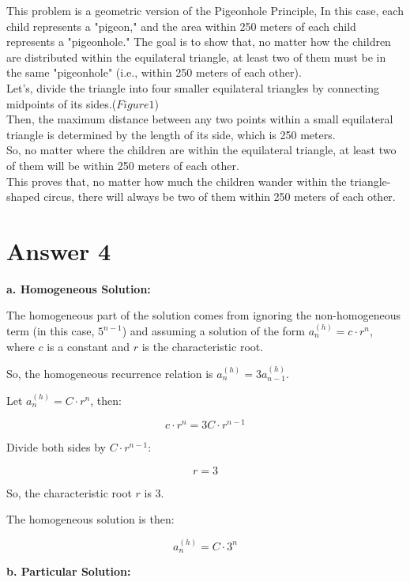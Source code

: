 \documentclass[12pt]{article}
\begin{document}
    This problem is a geometric version of the Pigeonhole Principle, In this case, each child represents a "pigeon," and the area within 250 meters of each child represents a "pigeonhole." The goal is to show that, no matter how the children are distributed within the equilateral triangle, at least two of them must be in the same "pigeonhole" (i.e., within 250 meters of each other). \\

    Let's, divide the triangle into four smaller equilateral triangles by connecting midpoints of its sides.(\( Figure 1 \))\\

    Then, the maximum distance between any two points within a small equilateral triangle is determined by the length of its side, which is 250 meters.\\

    So, no matter where the children are within the equilateral triangle, at least two of them will be within 250 meters of each other.\\

    This proves that, no matter how much the children wander within the triangle-shaped circus, there will always be two of them within 250 meters of each other.\\

\section*{Answer 4}
\textbf{a. Homogeneous Solution:}

The homogeneous part of the solution comes from ignoring the non-homogeneous term (in this case, \(5^{n-1}\)) and assuming a solution of the form \(a_n^{(h)} = c \cdot r^n\), where \(c\) is a constant and \(r\) is the characteristic root.

So, the homogeneous recurrence relation is \(a_n^{(h)} = 3a_{n-1}^{(h)}\).

Let \(a_n^{(h)} = C \cdot r^n\), then:

\[c \cdot r^n = 3C \cdot r^{n-1}\]

Divide both sides by \(C \cdot r^{n-1}\):

\[r = 3\]

So, the characteristic root \(r\) is 3.

The homogeneous solution is then:

\[a_n^{(h)} = C \cdot 3^n\]

\textbf{b. Particular Solution:}
\end{document}
